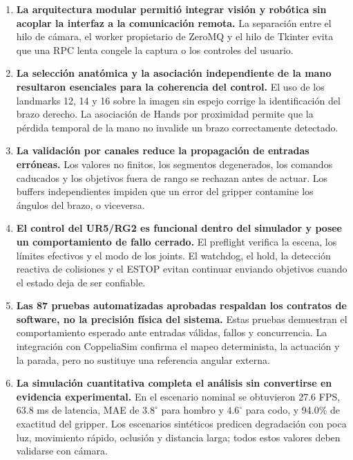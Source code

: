 \begin{enumerate}
    \item \textbf{La arquitectura modular permitió integrar visión y robótica
    sin acoplar la interfaz a la comunicación remota.} La separación entre el
    hilo de cámara, el worker propietario de ZeroMQ y el hilo de Tkinter evita
    que una RPC lenta congele la captura o los controles del usuario.

    \item \textbf{La selección anatómica y la asociación independiente de la
    mano resultaron esenciales para la coherencia del control.} El uso de los
    landmarks 12, 14 y 16 sobre la imagen sin espejo corrige la identificación
    del brazo derecho. La asociación de Hands por proximidad permite que la
    pérdida temporal de la mano no invalide un brazo correctamente detectado.

    \item \textbf{La validación por canales reduce la propagación de entradas
    erróneas.} Los valores no finitos, los segmentos degenerados, los comandos
    caducados y los objetivos fuera de rango se rechazan antes de actuar. Los
    buffers independientes impiden que un error del gripper contamine los
    ángulos del brazo, o viceversa.

    \item \textbf{El control del UR5/RG2 es funcional dentro del simulador y
    posee un comportamiento de fallo cerrado.} El preflight verifica la escena,
    los límites efectivos y el modo de los joints. El watchdog, el hold, la
    detección reactiva de colisiones y el ESTOP evitan continuar enviando
    objetivos cuando el estado deja de ser confiable.

    \item \textbf{Las 87 pruebas automatizadas aprobadas respaldan los
    contratos de software, no la precisión física del sistema.} Estas pruebas
    demuestran el comportamiento esperado ante entradas válidas, fallos y
    concurrencia. La integración con CoppeliaSim confirma el mapeo determinista,
    la actuación y la parada, pero no sustituye una referencia angular externa.

    \item \textbf{La simulación cuantitativa completa el análisis sin
    convertirse en evidencia experimental.} En el escenario nominal se
    obtuvieron 27.6 FPS, 63.8 ms de latencia, MAE de $3.8^\circ$ para hombro y
    $4.6^\circ$ para codo, y 94.0\% de exactitud del gripper. Los escenarios
    sintéticos predicen degradación con poca luz, movimiento rápido, oclusión y
    distancia larga; todos estos valores deben validarse con cámara.


\end{enumerate}
